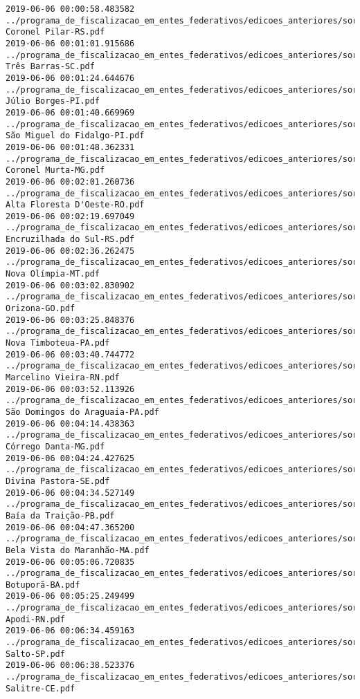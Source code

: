 \begin{lstlisting}
2019-06-06 00:00:58.483582 ../programa_de_fiscalizacao_em_entes_federativos/edicoes_anteriores/sorteio_39/3210-Coronel Pilar-RS.pdf
2019-06-06 00:01:01.915686 ../programa_de_fiscalizacao_em_entes_federativos/edicoes_anteriores/sorteio_39/3218-Três Barras-SC.pdf
2019-06-06 00:01:24.644676 ../programa_de_fiscalizacao_em_entes_federativos/edicoes_anteriores/sorteio_39/3190-Júlio Borges-PI.pdf
2019-06-06 00:01:40.669969 ../programa_de_fiscalizacao_em_entes_federativos/edicoes_anteriores/sorteio_39/3192-São Miguel do Fidalgo-PI.pdf
2019-06-06 00:01:48.362331 ../programa_de_fiscalizacao_em_entes_federativos/edicoes_anteriores/sorteio_39/3158-Coronel Murta-MG.pdf
2019-06-06 00:02:01.260736 ../programa_de_fiscalizacao_em_entes_federativos/edicoes_anteriores/sorteio_39/3208-Alta Floresta D'Oeste-RO.pdf
2019-06-06 00:02:19.697049 ../programa_de_fiscalizacao_em_entes_federativos/edicoes_anteriores/sorteio_39/3212-Encruzilhada do Sul-RS.pdf
2019-06-06 00:02:36.262475 ../programa_de_fiscalizacao_em_entes_federativos/edicoes_anteriores/sorteio_39/3174-Nova Olímpia-MT.pdf
2019-06-06 00:03:02.830902 ../programa_de_fiscalizacao_em_entes_federativos/edicoes_anteriores/sorteio_39/3150-Orizona-GO.pdf
2019-06-06 00:03:25.848376 ../programa_de_fiscalizacao_em_entes_federativos/edicoes_anteriores/sorteio_39/3177-Nova Timboteua-PA.pdf
2019-06-06 00:03:40.744772 ../programa_de_fiscalizacao_em_entes_federativos/edicoes_anteriores/sorteio_39/3204-Marcelino Vieira-RN.pdf
2019-06-06 00:03:52.113926 ../programa_de_fiscalizacao_em_entes_federativos/edicoes_anteriores/sorteio_39/3179-São Domingos do Araguaia-PA.pdf
2019-06-06 00:04:14.438363 ../programa_de_fiscalizacao_em_entes_federativos/edicoes_anteriores/sorteio_39/3160-Córrego Danta-MG.pdf
2019-06-06 00:04:24.427625 ../programa_de_fiscalizacao_em_entes_federativos/edicoes_anteriores/sorteio_39/3222-Divina Pastora-SE.pdf
2019-06-06 00:04:34.527149 ../programa_de_fiscalizacao_em_entes_federativos/edicoes_anteriores/sorteio_39/3180-Baía da Traição-PB.pdf
2019-06-06 00:04:47.365200 ../programa_de_fiscalizacao_em_entes_federativos/edicoes_anteriores/sorteio_39/3152-Bela Vista do Maranhão-MA.pdf
2019-06-06 00:05:06.720835 ../programa_de_fiscalizacao_em_entes_federativos/edicoes_anteriores/sorteio_39/3128-Botuporã-BA.pdf
2019-06-06 00:05:25.249499 ../programa_de_fiscalizacao_em_entes_federativos/edicoes_anteriores/sorteio_39/3202-Apodi-RN.pdf
2019-06-06 00:06:34.459163 ../programa_de_fiscalizacao_em_entes_federativos/edicoes_anteriores/sorteio_39/3236-Salto-SP.pdf
2019-06-06 00:06:38.523376 ../programa_de_fiscalizacao_em_entes_federativos/edicoes_anteriores/sorteio_39/3140-Salitre-CE.pdf

\end{lstlisting}
